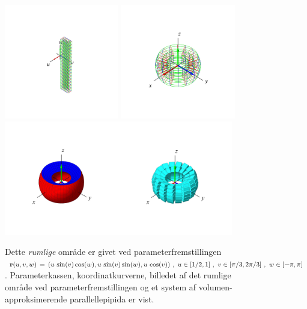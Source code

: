 \begin{figure}[h]
\centerline{\includegraphics[height=50mm]{FIGS/plotSpherePart1} \includegraphics[height=50mm]{FIGS/plotSpherePart3}\includegraphics[height=50mm]{FIGS/plotSpherePart2}\includegraphics[height=50mm]{FIGS/plotSpherePart4} }
\begin{center}
\caption{\small{Dette {\em rumlige} område er
givet ved parameterfremstillingen ${\bf r}(u, v,
w) \, = \, (u\,\sin(v)\cos(w), u\,\sin(v)\sin(w),
u\,\cos(v) ) \,\,, \,\, u \in [1/2, 1 ]\,\, , \, \,
v \in [\pi/3, 2\pi/3]\,\, , \, \, w \in [-\pi, \pi] $.
Parameterkassen, koordinatkurverne, billedet af det rumlige område ved parameterfremstillingen og et system af
volumen-approksimerende parallellepipida er vist.}} \label{figKugle13}
\end{center}
\end{figure}


